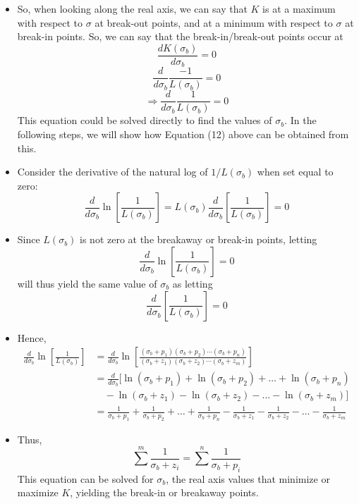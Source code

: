 \documentclass{book}
\begin{document}
\begin{itemize}
\begin{center}
	\end{center}
	\item So, when looking along the real axis, we can say that $ K $ is at a maximum with respect to $ \sigma $ at break-out points, and at a minimum with respect to $ \sigma $ at break-in points. So, we can say that the break-in/break-out points occur at
	\[ \frac{dK(\sigma_b)}{d\sigma_b} = 0 \]
	\[ \frac{d}{d\sigma_b} \frac{-1}{L(\sigma_b)} = 0 \]
	\[ \Rightarrow \frac{d}{d\sigma_b} \frac{1}{L(\sigma_b)} = 0 \]
	This equation could be solved directly to find the values of $ \sigma_b $. In the following steps, we will show how Equation (12) above can be obtained from this.
	\item Consider the derivative of the natural log of $ 1/L(\sigma_b) $ when set equal to zero:
	\[ \frac{d}{d\sigma_b} \ln \left[ \frac{1}{L(\sigma_b)} \right] = L(\sigma_b) \frac{d}{d\sigma_b} \left[\frac{1}{L(\sigma_b)}\right] = 0 \]
	\item Since $ L(\sigma_b) $ is not zero at the breakaway or break-in points, letting
	\[ \frac{d}{d\sigma_b} \ln \left[ \frac{1}{L(\sigma_b)} \right] = 0 \]
	will thus yield the same value of $ \sigma_b $ as letting
	\[ \frac{d}{d\sigma_b} \left[ \frac{1}{L(\sigma_b)} \right] = 0 \]
	\item Hence,
	\begin{align*}
	\frac{d}{d\sigma_b} \ln \left[\frac{1}{L(\sigma_b)}\right] &= \frac{d}{d\sigma_b} \ln \left[ \frac{(\sigma_b+p_1)(\sigma_b+p_2)\cdots(\sigma_b+p_n)}{(\sigma_b+z_1)(\sigma_b+z_2)\cdots(\sigma_b+z_m)} \right] \\
	&= \frac{d}{d\sigma_b}\big[ \ln (\sigma_b+p_1) + \ln (\sigma_b+p_2) + \ldots + \ln (\sigma_b+p_n) \\ 
	& \quad - \ln (\sigma_b+z_1) - \ln (\sigma_b+z_2) - \ldots - \ln (\sigma_b+z_m) \big] \\
	& =\frac{1}{\sigma_b+p_1} + \frac{1}{\sigma_b+p_2} + \ldots + \frac{1}{\sigma_b+p_n} - \frac{1}{\sigma_b+z_1} - \frac{1}{\sigma_b+z_2} - \ldots - \frac{1}{\sigma_b+z_m}
	\end{align*}
	\item Thus,
	\[ \sum^m \frac{1}{\sigma_b+z_i} = \sum^n \frac{1}{\sigma_b+p_i} \]
	This equation can be solved for $ \sigma_b $, the real axis values that minimize or maximize $ K $, yielding the break-in or breakaway points.
\end{itemize}
\end{document}
